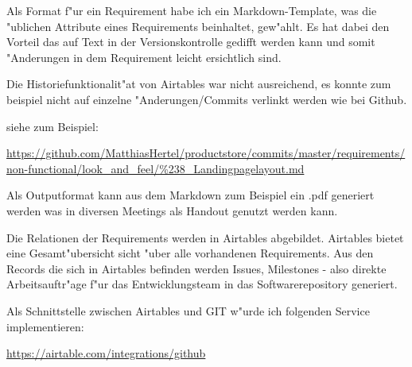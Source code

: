 \documentclass[12pt]{article}
\begin{document}
Als Format f"ur ein Requirement habe ich ein Markdown-Template, was die "ublichen Attribute eines Requirements beinhaltet, gew"ahlt.
Es hat dabei den Vorteil das auf Text in der Versionskontrolle gedifft werden kann und somit "Anderungen in dem Requirement leicht ersichtlich sind.

Die Historiefunktionalit"at von Airtables war nicht ausreichend, es konnte zum beispiel nicht auf einzelne "Anderungen/Commits verlinkt werden wie bei Github.

siehe zum Beispiel:

\url{https://github.com/MatthiasHertel/productstore/commits/master/requirements/non-functional/look_and_feel/%238_Landingpagelayout.md}


\smallbreak
Als Outputformat kann aus dem Markdown zum Beispiel ein .pdf generiert werden was in diversen Meetings als Handout genutzt werden kann.

Die Relationen der Requirements werden in Airtables abgebildet. Airtables bietet eine Gesamt"ubersicht sicht "uber alle vorhandenen Requirements.
Aus den Records die sich in Airtables befinden werden Issues, Milestones - also direkte Arbeitsauftr"age f"ur das Entwicklungsteam in das Softwarerepository generiert.

Als Schnittstelle zwischen Airtables und GIT w"urde ich folgenden Service implementieren:

\url{https://airtable.com/integrations/github}











\end{document}
